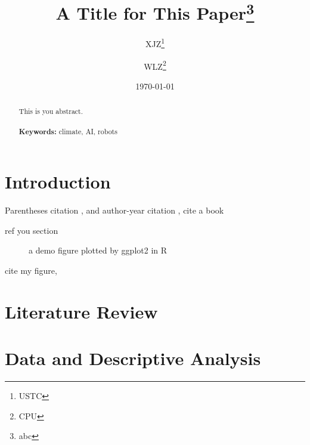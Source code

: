 \documentclass[a4paper, 12pt]{article}
\begin{document}
\begin{titlepage}
    \title{A Title for This Paper\thanks{abc}}
    \author{XJZ\thanks{USTC} \and WLZ\thanks{CPU}}
    \date{\today}
    \maketitle
    \begin{abstract}
        \noindent
        This is you abstract.
        \\
        \vspace{0in}\\
        \noindent\textbf{Keywords:} climate, AI, robots\\
        \bigskip
    \end{abstract}
    \setcounter{page}{0}
    \thispagestyle{empty}
\end{titlepage}
\pagebreak \newpage
\doublespacing

\section{Introduction}\label{sec:intro}
Parentheses citation \citep{DunningHuchetteLubin2017,DunningHuchetteLubin2017}, and author-year citation \citet{DunningHuchetteLubin2017}, cite a book \citep[\S 2.1.1]{DunningHuchetteLubin2017}

ref you section 
\begin{figure}[!htbp]
    \centering
    
    \caption{a demo figure plotted by ggplot2 in R}
    \label{fig:demo}
\end{figure}
cite my figure, 

\begin{figure}[!htbp]
    \centering
    
\end{figure}


\section{Literature Review}
\section{Data and Descriptive Analysis}
\end{document}
